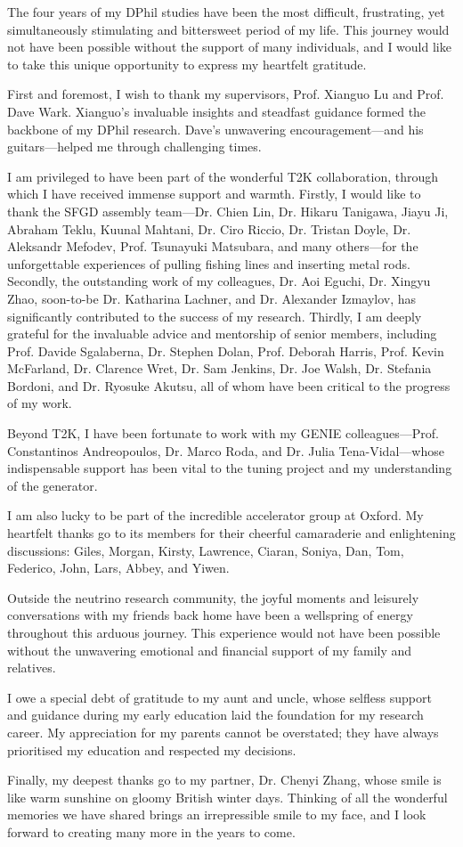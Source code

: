 The four years of my DPhil studies have been the most difficult, frustrating, yet simultaneously stimulating and bittersweet period of my life. 
This journey would not have been possible without the support of many individuals, and I would like to take this unique opportunity to express my heartfelt gratitude.

First and foremost, I wish to thank my supervisors, Prof. Xianguo Lu and Prof. Dave Wark. 
Xianguo's invaluable insights and steadfast guidance formed the backbone of my DPhil research. 
Dave's unwavering encouragement—and his guitars—helped me through challenging times.

I am privileged to have been part of the wonderful T2K collaboration, through which I have received immense support and warmth. 
Firstly, I would like to thank the SFGD assembly team—Dr. Chien Lin, Dr. Hikaru Tanigawa, Jiayu Ji, Abraham Teklu, Kuunal Mahtani, Dr. Ciro Riccio, Dr. Tristan Doyle, Dr. Aleksandr Mefodev, Prof. Tsunayuki Matsubara, and many others—for the unforgettable experiences of pulling fishing lines and inserting metal rods. 
Secondly, the outstanding work of my colleagues, Dr. Aoi Eguchi, Dr. Xingyu Zhao, soon-to-be Dr. Katharina Lachner, and Dr. Alexander Izmaylov, has significantly contributed to the success of my research. 
Thirdly, I am deeply grateful for the invaluable advice and mentorship of senior members, including Prof. Davide Sgalaberna, Dr. Stephen Dolan, Prof. Deborah Harris, Prof. Kevin McFarland, Dr. Clarence Wret, Dr. Sam Jenkins, Dr. Joe Walsh, Dr. Stefania Bordoni, and Dr. Ryosuke Akutsu, all of whom have been critical to the progress of my work.

Beyond T2K, I have been fortunate to work with my GENIE colleagues—Prof. Constantinos Andreopoulos, Dr. Marco Roda, and Dr. Julia Tena-Vidal—whose indispensable support has been vital to the tuning project and my understanding of the \genie generator.

I am also lucky to be part of the incredible accelerator group at Oxford. My heartfelt thanks go to its members for their cheerful camaraderie and enlightening discussions: Giles, Morgan, Kirsty, Lawrence, Ciaran, Soniya, Dan, Tom, Federico, John, Lars, Abbey, and Yiwen.

Outside the neutrino research community, the joyful moments and leisurely conversations with my friends back home have been a wellspring of energy throughout this arduous journey. This experience would not have been possible without the unwavering emotional and financial support of my family and relatives.

I owe a special debt of gratitude to my aunt and uncle, whose selfless support and guidance during my early education laid the foundation for my research career. My appreciation for my parents cannot be overstated; they have always prioritised my education and respected my decisions.

Finally, my deepest thanks go to my partner, Dr. Chenyi Zhang, whose smile is like warm sunshine on gloomy British winter days. Thinking of all the wonderful memories we have shared brings an irrepressible smile to my face, and I look forward to creating many more in the years to come.
